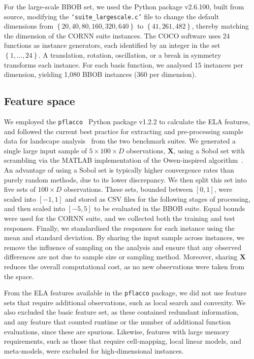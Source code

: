\documentclass[acmsmall,screen,review,anonymous]{acmart}
\begin{document}
For the large-scale BBOB set, we used the Python package v2.6.100, built from source, modifying the \texttt{`suite_largescale.c'} file to change the default dimensions from $\left\{20, 40, 80, 160, 320, 640\right\}$ to $\left\{41, 261, 482\right\}$, thereby matching the dimension of the CORNN suite instances. The COCO software uses 24 functions as instance generators, each identified by an integer in the set $\left\{1,\ldots,24\right\}$. A translation, rotation, oscillation, or a break in symmetry transforms each instance. For each basis function, we analysed 15 instances per dimension, yielding 1,080 BBOB instances (360 per dimension).

\subsection{Feature space}
We employed the \texttt{pflacco}~\cite{Prager2024} Python package v1.2.2 to calculate the ELA features, and followed the current best practice for extracting and pre-processing sample data for landscape analysis~\cite{Renau2020,Prager2023} from the two benchmark suites. We generated a single large input sample of $5\times100\times D$ observations, $\mathbf{X}$, using a Sobol set with scrambling via the MATLAB implementation of the Owen-inspired algorithm~\cite{Hong2003Algorithm823}. An advantage of using a Sobol set is typically higher convergence rates than purely random methods, due to its lower discrepancy. We then split this set into five sets of $100\times D$ observations. These sets, bounded between $\left[0,1\right]$, were scaled into $\left[-1,1\right]$ and stored as CSV files for the following stages of processing, and then scaled into $\left[-5,5\right]$ to be evaluated in the BBOB suite. Equal bounds were used for the CORNN suite, and we collected both the training and test responses. Finally, we standardised the responses for each instance using the mean and standard deviation. By sharing the input sample across instances, we remove the influence of sampling on the analysis and ensure that any observed differences are not due to sample size or sampling method. Moreover, sharing $\mathbf{X}$ reduces the overall computational cost, as no new observations were taken from the space.

From the ELA features available in the \texttt{pflacco} package, we did not use feature sets that require additional observations, such as local search and convexity. We also excluded the basic feature set, as these contained redundant information, and any feature that counted runtime or the number of additional function evaluations, since these are spurious. Likewise, features with large memory requirements, such as those that require cell-mapping, local linear models, and meta-models, were excluded for high-dimensional instances. 
\end{document}
